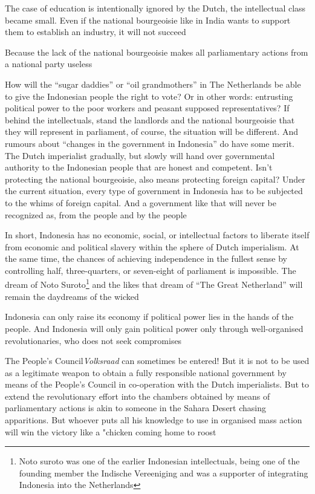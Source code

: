 The case of education is intentionally ignored by the Dutch, the intellectual class 
became small. Even if the national bourgeoisie like in India wants to support them 
to establish an industry, it will not succeed\vskip 0.2in

Because the lack of the national bourgeoisie makes all parliamentary actions from a national party useless\vskip 0.2in

How will the “sugar daddies” or “oil grandmothers” in The Netherlands be able 
to give the Indonesian people the right to vote? Or in other words: entrusting political 
power to the poor workers and peasant supposed representatives? If behind the intellectuals, 
stand the landlords and the national bourgeoisie that they will represent in parliament, 
of course, the situation will be different. And rumours about “changes in the government in Indonesia” 
do have some merit. The Dutch imperialist gradually, but slowly will hand over governmental authority 
to the Indonesian people that are honest and competent. Isn't protecting the national bourgeoisie, 
also means protecting foreign capital? Under the current situation, every type of government in 
Indonesia has to be subjected to the whims of foreign capital. And a government like that will never be recognized as, 
from the people and by the people\vskip 0.2in

In short, Indonesia has no economic, social, or intellectual factors to liberate itself 
from economic and political slavery within the sphere of Dutch imperialism. At the same 
time, the chances of achieving independence in the fullest sense by controlling half, 
three-quarters, or seven-eight of parliament is impossible. The dream of Noto Suroto\footnote[1]{ Noto suroto was one of the earlier Indonesian intellectuals, being one of the founding member the Indische Vereeniging and was a supporter of integrating Indonesia into the Netherlands}
and the likes that dream of “The Great Netherland” will remain the daydreams of the wicked\vskip 0.2in

Indonesia can only raise its economy if political power lies in the hands of the people. 
And Indonesia will only gain political power only through well-organised revolutionaries, who does not seek compromises\vskip 0.2in

The People's Council\emph{Volksraad} can sometimes be entered! But it is not to be used as a legitimate weapon 
to obtain a fully responsible national government by means of the People's Council in 
co-operation with the Dutch imperialists. But to extend the revolutionary effort into 
the chambers obtained by means of parliamentary actions is akin to someone in the Sahara Desert 
chasing apparitions. But whoever puts all his knowledge to use in organised mass action will win 
the victory like a "chicken coming home to roost\vskip 0.2in

